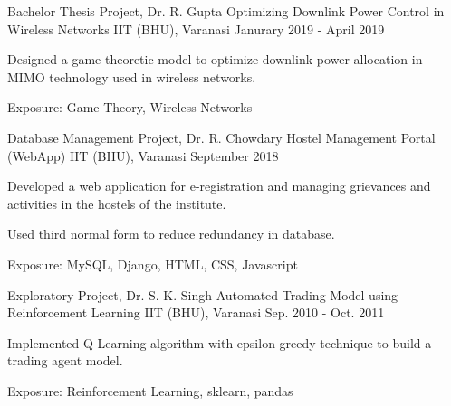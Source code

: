 \begin{cventries}
  \cventry
    {Bachelor Thesis Project, Dr. R. Gupta}
    {Optimizing Downlink Power Control in Wireless Networks}
    {IIT (BHU), Varanasi}
    {Janurary 2019 - April 2019}
    {
      \begin{cvitems}
        \item {Designed a game theoretic model to optimize downlink power allocation in MIMO technology used in wireless networks.}
        \item {Exposure: Game Theory, Wireless Networks}
      \end{cvitems}
    }

  \cventry
    {Database Management Project, Dr. R. Chowdary}
    {Hostel Management Portal (WebApp)}
    {IIT (BHU), Varanasi}
    {September 2018}
    {
      \begin{cvitems}
        \item {Developed a web application for e-registration and managing grievances and activities in the hostels of the institute.}
        \item {Used third normal form to reduce redundancy in database.}
        \item {Exposure: MySQL, Django, HTML, CSS, Javascript}
      \end{cvitems}
    }

  \cventry
    {Exploratory Project, Dr. S. K. Singh}
    {Automated Trading Model using Reinforcement Learning}
    {IIT (BHU), Varanasi}
    {Sep. 2010 - Oct. 2011}
    {
      \begin{cvitems}
        \item {Implemented Q-Learning algorithm with epsilon-greedy technique to build a trading agent model.}
        \item {Exposure: Reinforcement Learning, sklearn, pandas}
      \end{cvitems}
    }
\end{cventries}
